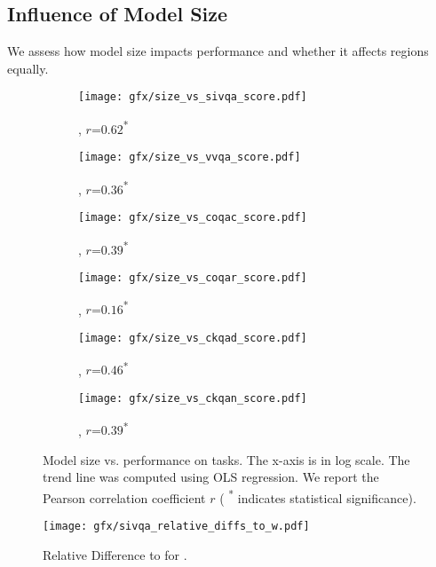 \subsection{Influence of Model Size}
\label{sec:analyses:a2_model}
%
We assess how model size impacts performance and whether it affects regions equally.

\begin{figure}[t]
    \centering
    \begin{subfigure}{0.30\linewidth}
        \centering
        \texttt{[image: gfx/size\_vs\_sivqa\_score.pdf]}
        \caption{\sivqa, \tiny{$r$=$0.62$\textsuperscript{*}}}
    \end{subfigure}
    \begin{subfigure}{0.30\linewidth}
        \centering
        \texttt{[image: gfx/size\_vs\_vvqa\_score.pdf]}
        \caption{\vvqa, \tiny{$r$=$0.36$\textsuperscript{*}}}
    \end{subfigure}
    \begin{subfigure}{0.30\linewidth}
        \centering
        \texttt{[image: gfx/size\_vs\_coqac\_score.pdf]}
        \caption{\coqac, \tiny{$r$=$0.39$\textsuperscript{*}}}
    \end{subfigure}

    \begin{subfigure}{0.30\linewidth}
        \centering
        \texttt{[image: gfx/size\_vs\_coqar\_score.pdf]}
        \caption{\coqar, \tiny{$r$=$0.16$\textsuperscript{*}}}
    \end{subfigure}
    \begin{subfigure}{0.30\linewidth}
        \centering
        \texttt{[image: gfx/size\_vs\_ckqad\_score.pdf]}
        \caption{\ckqad, \tiny{$r$=$0.46$}\textsuperscript{*}}
    \end{subfigure}
    \begin{subfigure}{0.30\linewidth}
        \centering
        \texttt{[image: gfx/size\_vs\_ckqan\_score.pdf]}
        \caption{\ckqan, \tiny{$r$=$0.39$}\textsuperscript{*}}
    \end{subfigure}
    \caption{Model size vs. performance on \dsname tasks. The x-axis is in log scale. The trend line was computed using OLS regression. We report the Pearson correlation coefficient $r$ ( \textsuperscript{*} indicates statistical significance).}
    \label{fig:sec:analyses:a2_model:size}
\end{figure}
%
\begin{figure}[t]
    \centering
    \texttt{[image: gfx/sivqa\_relative\_diffs\_to\_w.pdf]}
    \caption{Relative Difference to \RegW for \sivqa.}
    \label{fig:sec:analyses:a2_model:sivqa_relative_diffs_to_w}
\end{figure}

